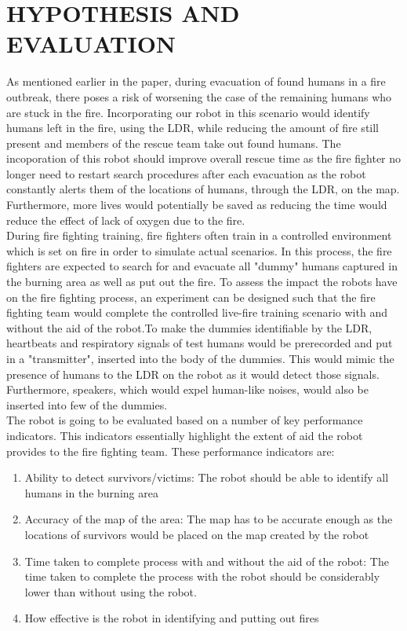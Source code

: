\section{HYPOTHESIS AND EVALUATION}\label{Sec:concl}
As mentioned earlier in the paper, during evacuation of found humans in a fire outbreak, there poses a risk of worsening the case of the remaining humans who are stuck in the fire. Incorporating our robot in this scenario would identify humans left in the fire, using the LDR, while reducing the amount of fire still present and members of the rescue team take out found humans. The incoporation of this robot should improve overall rescue time as the fire fighter no longer need to restart search procedures after each evacuation as the robot constantly alerts them of the locations of humans, through the LDR, on the map. Furthermore, more lives would potentially be saved as reducing the time would reduce the effect of lack of oxygen due to the fire. \\

During fire fighting training, fire fighters often train in a controlled environment which is
set on fire in order to simulate actual scenarios. In this process, the fire fighters are expected to search for and evacuate all "dummy" humans captured in the burning area as well as put out the fire. To assess the impact the robots have on the fire fighting process, an experiment can be designed such that the fire fighting team would complete the controlled live-fire training scenario with and without the aid of the robot.To make the dummies identifiable by the LDR, heartbeats and respiratory signals of test humans would be prerecorded and put in a "transmitter", inserted into the body of the dummies. This would mimic the presence of humans to the LDR on the robot as it would detect those signals. Furthermore, speakers, which would expel human-like noises, would also be inserted into few of the dummies.\\

The robot is going to be evaluated based on a number of key performance indicators. This indicators essentially highlight the extent of aid the robot provides to the fire fighting team. These performance indicators are:
\begin{enumerate}
    \item Ability to detect survivors/victims: The robot should be able to identify all humans in the burning area
    \item Accuracy of the map of the area: The map has to be accurate enough as the locations of survivors would be placed on the map created by the robot
    \item Time taken to complete process with and without the aid of the robot: The time taken to complete the process with the robot should be considerably lower than without  using the robot.
    \item How effective is the robot in identifying and putting out fires
\end{enumerate}


